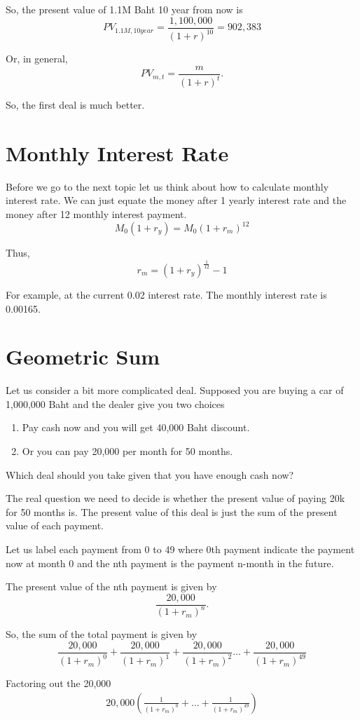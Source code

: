 \documentclass[a4paper, 12pt]{article}
\begin{document}
\begin{multicols}{2}
So, the present value of 1.1M Baht 10 year from now is
\[
	PV_{1.1M, 10year} = \frac{1,100,000}{(1+r)^{10}} = 902,383
\]

Or, in general,
\[
	PV_{m, t} = \frac{m}{(1+r)^t}.
\]

So, the first deal is much better.

\section*{Monthly Interest Rate}

Before we go to the next topic let us think about how to calculate monthly interest rate. We can just equate the money after 1 yearly interest rate and the money after 12 monthly interest payment.
\[
	M_0 (1+r_y) = M_0(1+r_m)^{12}
\]

Thus,
\[
	r_m = (1+r_y)^{\frac{1}{12}}-1
\]

For example, at the current 0.02 interest rate. The monthly interest rate is 0.00165.

\section*{Geometric Sum}

Let us consider a bit more complicated deal. Supposed you are buying a car of 1,000,000 Baht and the dealer give you two choices
\begin{enumerate}
	\item Pay cash now and you will get 40,000 Baht discount.
	\item Or you can pay 20,000 per month for 50 months.
\end{enumerate}
Which deal should you take given that you have enough cash now?

The real question we need to decide is whether the present value of paying 20k for 50 months is. The present value of this deal is just the sum of the present value of each payment.

Let us label each payment from 0 to 49 where 0th payment indicate the payment now at month 0 and the nth payment is the payment n-month in the future.

The present value of the nth payment is given by
\[
	\frac{20,000}{(1+r_m)^{n}}.
\]

So, the sum of the total payment is given by
\[
	\frac{20,000}{(1+r_m)^{0}} + \frac{20,000}{(1+r_m)^{1}} + \frac{20,000}{(1+r_m)^{2}} \ldots + \frac{20,000}{(1+r_m)^{49}}
\]

Factoring out the 20,000
\begin{align*}
	20,000\left(\frac{1}{(1+r_m)^{0}} +\ldots+ \frac{1}{(1+r_m)^{49}} \right)
\end{align*}


\end{multicols}
\end{document}
